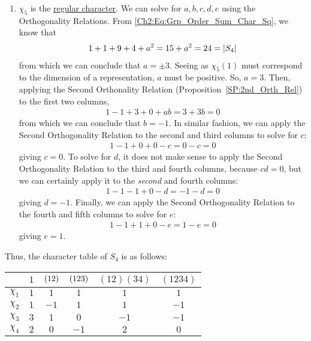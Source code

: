 \begin{boxexample}[$S_4$]
\begin{enumerate}
        \item $\chi_5$ is the \underline{regular character}. We can solve for $a,b,c,d,e$ using the Orthogonality Relations. From \eqref{Ch2:Eq:Grp_Order_Sum_Char_Sq}, we know that
        \begin{align*}
            1 + 1 + 9 + 4 + a^2 = 15 + a^2 = 24 = \left\lvert S_4 \right\rvert
        \end{align*}
        from which we can conclude that $a = \pm 3$. Seeing as $\chi_5(1)$ must correspond to the dimension of a representation, $a$ must be positive. So, $a = 3$. Then, applying the Second Orthonality Relation (Proposition~\ref{SP:2nd_Orth_Rel}) to the first two columns,
        \begin{align*}
            1 - 1 + 3 + 0 + ab = 3 + 3b = 0
        \end{align*}
        from which we can conclude that $b = -1$. In similar fashion, we can apply the Second Orthogonality Relation to the second and third columns to solve for $c$:
        \begin{align*}
            1 - 1 + 0 + 0 - c = 0 - c = 0
        \end{align*}
        giving $c = 0$. To solve for $d$, it does not make sense to apply the Second Orthogonality Relation to the third and fourth columns, because $cd = 0$, but we can certainly apply it to the \textit{second} and fourth columns:
        \begin{align*}
            1 - 1 - 1 + 0 - d = -1 - d = 0
        \end{align*}
        giving $d = -1$. Finally, we can apply the Second Orthogonality Relation to the fourth and fifth columns to solve for $e$:
        \begin{align*}
            1 - 1 + 1 + 0 - e = 1 - e = 0
        \end{align*}
        giving $e = 1$.
    \end{enumerate}
    Thus, the character table of $S_4$ is as follows:
    \begin{table}[H]
        \centering
        \begin{tabular}{c|ccccc}
            & $1$ & $\left( 12 \right)$ & $\left( 123 \right)$ & $(12)(34)$ & $(1234)$ \\
            \hline
            $\chi_1$ & $1$ & $1$ & $1$ & $1$ & $1$ \\
            $\chi_2$ & $1$ & $-1$ & $1$ & $1$ & $-1$ \\
            $\chi_3$ & $3$ & $1$ & $0$ & $-1$ & $-1$ \\
            $\chi_4$ & $2$ & $0$ & $-1$ & $2$ & $0$ \\

\end{tabular}
\end{table}
\end{boxexample}
